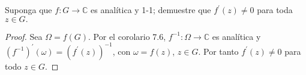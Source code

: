 \documentclass[12pt]{article}
\newcommand{\C}{\mathbb{C}}
\newenvironment{problem}[2][Problema]{\begin{trivlist}
\item[\hskip \labelsep {\bfseries #1}\hskip \labelsep {\bfseries #2.}]}{\end{trivlist}}
\begin{document}
\begin{problem}{4 pp. 99}
Suponga que $f: G \rightarrow \C$ es analítica y 1-1; demuestre que $f^\prime(z) \neq 0$ para toda $z \in G.$
\end{problem}
\begin{proof} Sea $\Omega = f(G).$ Por el corolario 7.6, $f^{-1}: \Omega \rightarrow \C$ es analítica y $(f^{-1})^\prime(\omega) = (f^\prime(z))^{-1}$, con $\omega = f(z)$, $z\in G.$ Por tanto $f^\prime(z) \neq 0$ para todo $z \in G.$
\end{proof}

\printbibliography
\end{document}
